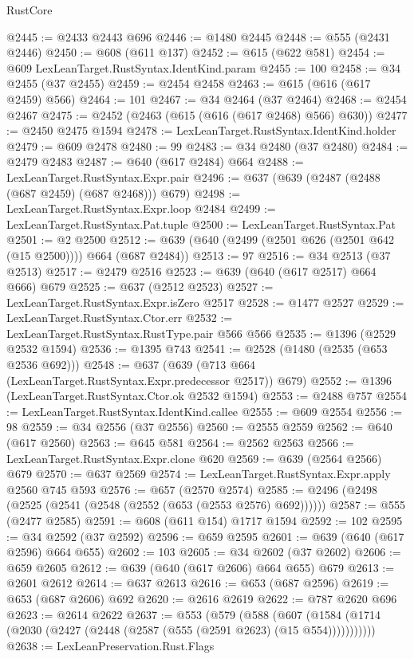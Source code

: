 \begin{lexlean}{RustCore}
\begin{coremodule}
@2445 := @2433 @2443 @696
@2446 := @1480 @2445
@2448 := @555 (@2431 @2446)
@2450 := @608 (@611 @137)
@2452 := @615 (@622 @581)
@2454 := @609 LexLeanTarget.RustSyntax.IdentKind.param
@2455 := 100
@2458 := @34 @2455 (@37 @2455)
@2459 := @2454 @2458
@2463 := @615 (@616 (@617 @2459) @566)
@2464 := 101
@2467 := @34 @2464 (@37 @2464)
@2468 := @2454 @2467
@2475 := @2452 (@2463 (@615 (@616 (@617 @2468) @566) @630))
@2477 := @2450 @2475 @1594
@2478 := LexLeanTarget.RustSyntax.IdentKind.holder
@2479 := @609 @2478
@2480 := 99
@2483 := @34 @2480 (@37 @2480)
@2484 := @2479 @2483
@2487 := @640 (@617 @2484) @664
@2488 := LexLeanTarget.RustSyntax.Expr.pair
@2496 := @637 (@639 (@2487 (@2488 (@687 @2459) (@687 @2468))) @679)
@2498 := LexLeanTarget.RustSyntax.Expr.loop @2484
@2499 := LexLeanTarget.RustSyntax.Pat.tuple
@2500 := LexLeanTarget.RustSyntax.Pat
@2501 := @2 @2500
@2512 := @639 (@640 (@2499 (@2501 @626 (@2501 @642 (@15 @2500)))) @664 (@687 @2484))
@2513 := 97
@2516 := @34 @2513 (@37 @2513)
@2517 := @2479 @2516
@2523 := @639 (@640 (@617 @2517) @664 @666) @679
@2525 := @637 (@2512 @2523)
@2527 := LexLeanTarget.RustSyntax.Expr.isZero @2517
@2528 := @1477 @2527
@2529 := LexLeanTarget.RustSyntax.Ctor.err
@2532 := LexLeanTarget.RustSyntax.RustType.pair @566 @566
@2535 := @1396 (@2529 @2532 @1594)
@2536 := @1395 @743
@2541 := @2528 (@1480 (@2535 (@653 @2536 @692)))
@2548 := @637 (@639 (@713 @664 (LexLeanTarget.RustSyntax.Expr.predecessor @2517)) @679)
@2552 := @1396 (LexLeanTarget.RustSyntax.Ctor.ok @2532 @1594)
@2553 := @2488 @757
@2554 := LexLeanTarget.RustSyntax.IdentKind.callee
@2555 := @609 @2554
@2556 := 98
@2559 := @34 @2556 (@37 @2556)
@2560 := @2555 @2559
@2562 := @640 (@617 @2560)
@2563 := @645 @581
@2564 := @2562 @2563
@2566 := LexLeanTarget.RustSyntax.Expr.clone @620
@2569 := @639 (@2564 @2566) @679
@2570 := @637 @2569
@2574 := LexLeanTarget.RustSyntax.Expr.apply @2560 @745 @593
@2576 := @657 (@2570 @2574)
@2585 := @2496 (@2498 (@2525 (@2541 (@2548 (@2552 (@653 (@2553 @2576) @692))))))
@2587 := @555 (@2477 @2585)
@2591 := @608 (@611 @154) @1717 @1594
@2592 := 102
@2595 := @34 @2592 (@37 @2592)
@2596 := @659 @2595
@2601 := @639 (@640 (@617 @2596) @664 @655)
@2602 := 103
@2605 := @34 @2602 (@37 @2602)
@2606 := @659 @2605
@2612 := @639 (@640 (@617 @2606) @664 @655) @679
@2613 := @2601 @2612
@2614 := @637 @2613
@2616 := @653 (@687 @2596)
@2619 := @653 (@687 @2606) @692
@2620 := @2616 @2619
@2622 := @787 @2620 @696
@2623 := @2614 @2622
@2637 := @553
    (@579
      (@588 (@607 (@1584 (@1714 (@2030 (@2427 (@2448 (@2587 (@555 (@2591 @2623) (@15 @554)))))))))))
@2638 := LexLeanPreservation.Rust.Flags

\end{coremodule}
\end{lexlean}
